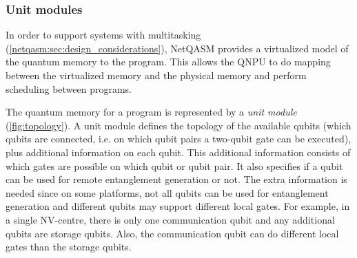 
\subsubsection{Unit modules}
In order to support systems with multitasking (\cref{netqasm:sec:design_considerations}), \ac{NetQASM} provides a virtualized model of the quantum memory to the program.
This allows the \ac{QNPU} to do mapping between the virtualized memory and the physical memory and perform scheduling between programs.

The quantum memory for a program is represented by a \textit{unit module} (\cref{fig:topology}).
A unit module defines the topology of the available qubits (which qubits are connected, i.e. on which qubit pairs a two-qubit gate can be executed), plus additional information on each qubit.
This additional information consists of which gates are possible on which qubit or qubit pair.
It also specifies if a qubit can be used for remote entanglement generation or not.
The extra information is needed since on some platforms, not all qubits can be used for entanglement generation and different qubits may support different local gates.
For example, in a single NV-centre, there is only one communication qubit and any additional qubits are storage qubits.
Also, the communication qubit can do different local gates than the storage qubits.

